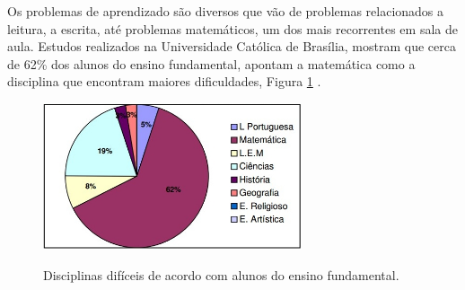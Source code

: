 \documentclass[
	12pt,				%
    oneside,			%
	a4paper,			%
	english,			%
	french,				%
	spanish,			%
	brazil,				%
	]{abntex2}
\begin{document}
Os problemas de aprendizado são diversos que vão de problemas relacionados a leitura, a escrita, até problemas matemáticos, um dos mais recorrentes em sala de aula. Estudos realizados na Universidade Católica de Brasília, mostram que cerca de 62\% dos alunos do ensino fundamental, apontam a matemática como a disciplina que encontram maiores dificuldades, Figura \ref{matematica} \cite{Machado}.


\begin{figure} [ht] 


\caption{Disciplinas difíceis de acordo com alunos do ensino fundamental.}

\includegraphics[width=0.68\textwidth]{grafico_pizza.jpg} %
\\
\centering
{}
\label{matematica} 
\end{figure}
\end{document}
